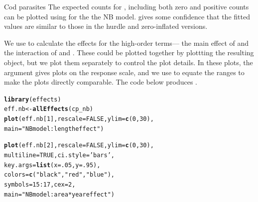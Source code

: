 \documentclass[11pt]{book}\usepackage[]{graphicx}\usepackage[]{color}
\makeatletter
\newcommand{\hlnum}[1]{\textcolor[rgb]{0.686,0.059,0.569}{#1}}%
\newcommand{\hlstr}[1]{\textcolor[rgb]{0.192,0.494,0.8}{#1}}%
\newcommand{\hlopt}[1]{\textcolor[rgb]{0,0,0}{#1}}%
\newcommand{\hlstd}[1]{\textcolor[rgb]{0.345,0.345,0.345}{#1}}%
\newcommand{\hlkwb}[1]{\textcolor[rgb]{0.69,0.353,0.396}{#1}}%
\newcommand{\hlkwc}[1]{\textcolor[rgb]{0.333,0.667,0.333}{#1}}%
\newcommand{\hlkwd}[1]{\textcolor[rgb]{0.737,0.353,0.396}{\textbf{#1}}}%
\newenvironment{kframe}{%
 \def\at@end@of@kframe{}%
 \ifinner\ifhmode%
  \def\at@end@of@kframe{\end{minipage}}%
  \begin{minipage}{\columnwidth}%
 \fi\fi%
 \def\FrameCommand##1{\hskip\@totalleftmargin \hskip-\fboxsep
 \colorbox{shadecolor}{##1}\hskip-\fboxsep
     \hskip-\linewidth \hskip-\@totalleftmargin \hskip\columnwidth}%
 \MakeFramed {\advance\hsize-\width
   \@totalleftmargin\z@ \linewidth\hsize
   \@setminipage}}%
 {\par\unskip\endMakeFramed%
 \at@end@of@kframe}
\newenvironment{knitrout}{}{} %
\renewenvironment{knitrout}{\small\renewcommand{\baselinestretch}{.85}}{} %
\makeatother
\begin{document}
\begin{Example}[cod3]{Cod parasites}
The expected counts for , including both zero and positive counts
can be plotted using  for the the  NB model.
 gives some confidence that the fitted values
are similar to those in the hurdle and zero-inflated versions.

We use  to calculate the effects for the high-order terms--- the
main effect of  and the interaction of  and .
These could be plotted together by plottting the resulting  object,
but we plot them separately to control the plot details.  In these plots,
the argument  gives plots on the response scale, and
we use  to equate the ranges to make the plots directly comparable.
The code below produces .

\begin{knitrout}
\color{fgcolor}\begin{kframe}
\begin{alltt}
\hlkwd{library}\hlstd{(effects)}
\hlstd{eff.nb} \hlkwb{<-} \hlkwd{allEffects}\hlstd{(cp_nb)}
\hlkwd{plot}\hlstd{(eff.nb[}\hlnum{1}\hlstd{],} \hlkwc{rescale}\hlstd{=}\hlnum{FALSE}\hlstd{,} \hlkwc{ylim}\hlstd{=}\hlkwd{c}\hlstd{(}\hlnum{0}\hlstd{,}\hlnum{30}\hlstd{),}
     \hlkwc{main}\hlstd{=}\hlstr{"NB model: length effect"}\hlstd{)}

\hlkwd{plot}\hlstd{(eff.nb[}\hlnum{2}\hlstd{],} \hlkwc{rescale}\hlstd{=}\hlnum{FALSE}\hlstd{,} \hlkwc{ylim}\hlstd{=}\hlkwd{c}\hlstd{(}\hlnum{0}\hlstd{,}\hlnum{30}\hlstd{),}
     \hlkwc{multiline}\hlstd{=}\hlnum{TRUE}\hlstd{,} \hlkwc{ci.style}\hlstd{=}\hlstr{'bars'}\hlstd{,}
     \hlkwc{key.args}\hlstd{=}\hlkwd{list}\hlstd{(}\hlkwc{x}\hlstd{=}\hlnum{.05}\hlstd{,} \hlkwc{y}\hlstd{=}\hlnum{.95}\hlstd{),}
     \hlkwc{colors}\hlstd{=}\hlkwd{c}\hlstd{(}\hlstr{"black"}\hlstd{,} \hlstr{"red"}\hlstd{,} \hlstr{"blue"}\hlstd{) ,}
     \hlkwc{symbols}\hlstd{=}\hlnum{15}\hlopt{:}\hlnum{17}\hlstd{,} \hlkwc{cex}\hlstd{=}\hlnum{2}\hlstd{,}
     \hlkwc{main}\hlstd{=}\hlstr{"NB model: area*year effect"}\hlstd{)}
\end{alltt}
\end{kframe}\begin{figure}[!htbp]



\end{figure}
\end{knitrout}
\end{Example}
\end{document}
